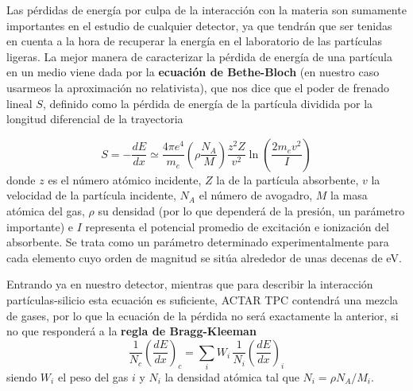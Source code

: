 Las pérdidas de energía por culpa de la interacción con la materia son sumamente importantes en el estudio de cualquier detector, ya que tendrán que ser tenidas en cuenta a la hora de recuperar la energía en el laboratorio de las partículas ligeras. La mejor manera de caracterizar la pérdida de energía de una partícula en un medio viene dada por la \textbf{ecuación de Bethe-Bloch} (en nuestro caso usarmeos la aproximación no relativista), que nos dice que el poder de frenado lineal $S$, definido como la pérdida de energía de la partícula dividida por la longitud diferencial de la trayectoria  \cite{Knoll:1300754}

\begin{equation}
	S = - \frac{dE}{dx} \simeq \frac{4 \pi e^4}{m_e} \left( \rho \frac{N_A}{M} \right) \frac{z^2 Z}{v^2} \ln \left( \frac{2 m_e v^2}{I} \right)
\end{equation}
donde $z$ es el número atómico incidente, $Z$ la de la partícula absorbente, $v$ la velocidad de la partícula incidente, $N_A$ el número de avogadro, $M$ la masa atómica del gas, $\rho$ su densidad (por lo que dependerá de la presión, un parámetro importante) e $I$  representa el potencial promedio de excitación e ionización del absorbente. Se trata como un parámetro determinado experimentalmente para cada elemento cuyo orden de magnitud se sitúa alrededor de unas decenas de eV.

Entrando ya en nuestro detector, mientras que para describir la interacción partículas-silicio esta ecuación es suficiente, ACTAR TPC contendrá  una mezcla de gases, por lo que la ecuación de la pérdida no será exactamente la anterior, si no que responderá a la \textbf{regla de Bragg-Kleeman} \cite{Knoll:1300754}
\begin{equation}
	\frac{1}{N_c} \left( \frac{dE}{dx} \right)_c = \sum_i W_i \, \frac{1}{N_i} \left( \frac{dE}{dx} \right)_i
\end{equation}
siendo $W_i$ el peso del gas $i$ y $N_i$ la densidad atómica tal que $N_i = \rho N_A	/ M_i$.

